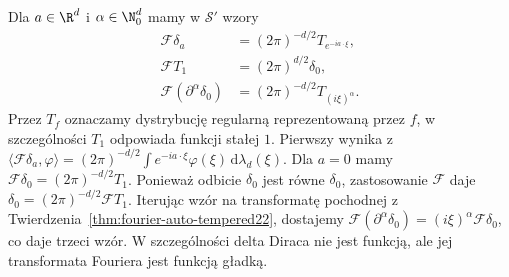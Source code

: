 \begin{przyklad}
\label{ex:fourier-delta22}
Dla $a\in\R^d$ i $\alpha\in\N_0^d$ mamy w $\mathcal S'$
wzory
\[
\begin{aligned}
\mathcal F\delta_a&=(2\pi)^{-d/2}T_{e^{-ia\cdot\xi}},\\
\mathcal F T_1&=(2\pi)^{d/2}\delta_0,\\
\mathcal F(\partial^\alpha\delta_0)
&=(2\pi)^{-d/2}T_{(i\xi)^\alpha}.
\end{aligned}
\]
Przez $T_f$ oznaczamy dystrybucję regularną
reprezentowaną przez $f$, w szczególności $T_1$
odpowiada funkcji stałej $1$.
Pierwszy wynika z
$\langle\mathcal F\delta_a,\varphi\rangle
=(2\pi)^{-d/2}\int e^{-ia\cdot\xi}\varphi(\xi)
\,\mathrm d\lambda_d(\xi)$.
Dla $a=0$ mamy $\mathcal F\delta_0=(2\pi)^{-d/2}T_1$.
Ponieważ odbicie $\delta_0$ jest równe $\delta_0$,
zastosowanie $\mathcal F$ daje
$\delta_0=(2\pi)^{-d/2}\mathcal F T_1$.
Iterując wzór na transformatę pochodnej z
Twierdzenia~\ref{thm:fourier-auto-tempered22}, dostajemy
$\mathcal F(\partial^\alpha\delta_0)
=(i\xi)^\alpha\mathcal F\delta_0$, co daje trzeci wzór.
W szczególności delta Diraca nie jest funkcją,
ale jej transformata Fouriera jest funkcją gładką.
\end{przyklad}

